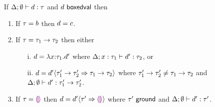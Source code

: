 \begin{theorem}
  If $\Delta; \emptyset \vdash d : \tau$ and $d~\mathsf{boxedval}$
  then
  \begin{enumerate}[label=(\alph*)]
    \item If $\tau=b$ then $d=c$.
    \item If $\tau=\tau_1 \rightarrow \tau_2$ then either
      \begin{enumerate}
        \item[i.]
          $d=\lambda x{:}\tau_1.d'$
          where $\Delta; x : \tau_1 \vdash d' : \tau_2$, or
        \item[ii.]
          $d=d' \langle{\tau_1' \rightarrow \tau_2'}\Rightarrow{\tau_1 \rightarrow \tau_2}\rangle$
          where $\tau_1' \rightarrow \tau_2'\neq\tau_1 \rightarrow \tau_2$
          and $\Delta; \emptyset \vdash d' : \tau_1' \rightarrow \tau_2'$.
      \end{enumerate}
    \item If $\tau=\textcolor{violet}{\llparenthesis}\textcolor{violet}{\rrparenthesis}$
          then $d=d' \langle{\tau'}\Rightarrow{\textcolor{violet}{\llparenthesis}\textcolor{violet}{\rrparenthesis}}\rangle$
          where $\tau'~\mathsf{ground}$
          and $\Delta; \emptyset \vdash d' : \tau'$.
  \end{enumerate}
\end{theorem}

